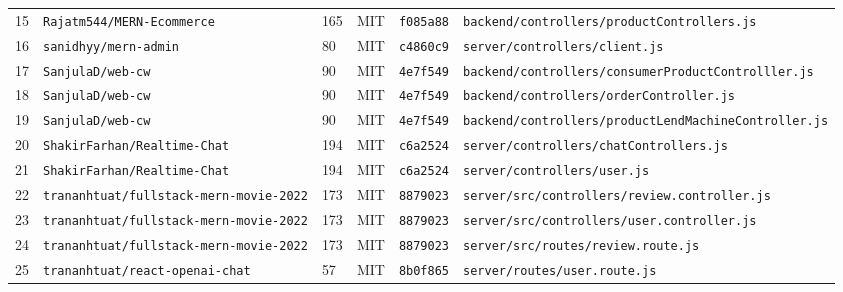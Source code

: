 \begin{table}[t]
\begin{tabular}{rllccl}
15 & \texttt{Rajatm544/MERN-Ecommerce} & 165 & MIT & \texttt{f085a88} & \texttt{backend/controllers/productControllers.js} \\
16 & \texttt{sanidhyy/mern-admin} & 80 & MIT & \texttt{c4860c9} & \texttt{server/controllers/client.js} \\
17 & \texttt{SanjulaD/web-cw} & 90 & MIT & \texttt{4e7f549} & \texttt{backend/controllers/consumerProductControlller.js} \\
18 & \texttt{SanjulaD/web-cw} & 90 & MIT & \texttt{4e7f549} & \texttt{backend/controllers/orderController.js} \\
19 & \texttt{SanjulaD/web-cw} & 90 & MIT & \texttt{4e7f549} & \texttt{backend/controllers/productLendMachineController.js} \\
20 & \texttt{ShakirFarhan/Realtime-Chat} & 194 & MIT & \texttt{c6a2524} & \texttt{server/controllers/chatControllers.js} \\
21 & \texttt{ShakirFarhan/Realtime-Chat} & 194 & MIT & \texttt{c6a2524} & \texttt{server/controllers/user.js} \\
22 & \texttt{trananhtuat/fullstack-mern-movie-2022} & 173 & MIT & \texttt{8879023} & \texttt{server/src/controllers/review.controller.js} \\
23 & \texttt{trananhtuat/fullstack-mern-movie-2022} & 173 & MIT & \texttt{8879023} & \texttt{server/src/controllers/user.controller.js} \\
24 & \texttt{trananhtuat/fullstack-mern-movie-2022} & 173 & MIT & \texttt{8879023} & \texttt{server/src/routes/review.route.js} \\
25 & \texttt{trananhtuat/react-openai-chat} & 57 & MIT & \texttt{8b0f865} & \texttt{server/routes/user.route.js} \\
\bottomrule
\end{tabular}
\end{table}

